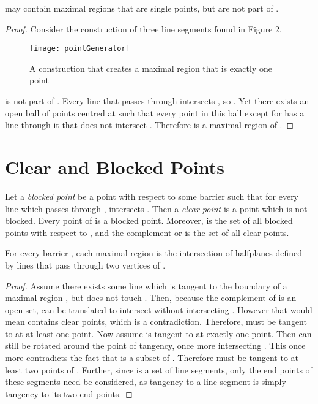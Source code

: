 \documentclass{cccg12}
\begin{document}
\begin{lemma}
\label{lemma:hasPoints}
 may contain maximal regions that are single points, but are not part of .
\end{lemma}

\begin{proof}
Consider the construction of three line segments found in Figure 2. 

\begin{figure}[ht]
  \centering
  \texttt{[image: pointGenerator]}
  \caption{A construction that creates a maximal region that is exactly one point}
  \label{fig:pointGenerator}
\end{figure}

 is not part of . Every line that passes through  intersects , so . Yet there exists an open ball of points centred at  such that every point in this ball except for  has a line through it that does not intersect . Therefore  is a maximal region of .\end{proof}



\section{Clear and Blocked Points}

Let a \emph{blocked point} be a point  with respect to some barrier  such that for every line  which passes through ,  intersects . Then a \emph{clear point} is a point which is not blocked. Every point of  is a blocked point. Moreover,  is the set of all blocked points with respect to , and the complement  or  is the set of all clear points. 

\begin{theorem}
\label{thm:tangency-boundary}
For every barrier , each maximal region  is the intersection of halfplanes defined by lines that pass through two vertices of .
\end{theorem}

\begin{proof}

Assume there exists some line  which is tangent to the boundary of a maximal region , but  does not touch . Then, because the complement of  is an open set,  can be translated to intersect  without intersecting . However that would mean  contains clear points, which is a contradiction. Therefore,  must be tangent to  at at least one point. Now assume  is tangent to  at exactly one point. Then  can still be rotated around the point of tangency, once more intersecting . This once more contradicts the fact that  is a subset of . Therefore  must be tangent to at least two points of . Further, since  is a set of line segments, only the end points of these segments need be considered, as tangency to a line segment is simply tangency to its two end points.\end{proof}
\end{document}

